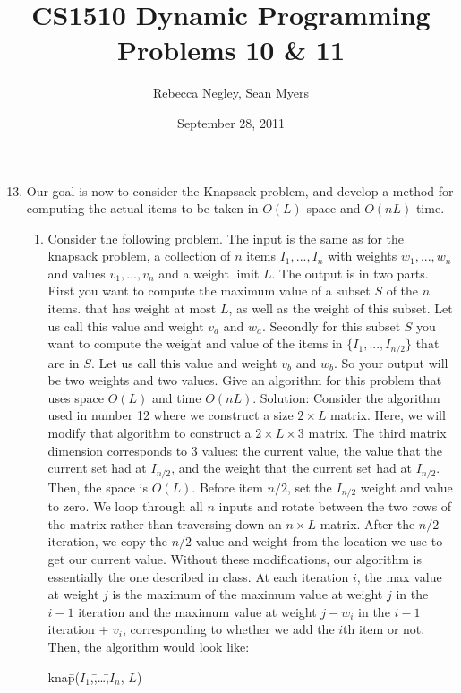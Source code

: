 \documentclass{article}
\title{CS1510  Dynamic Programming Problems 10 \& 11}
\author{Rebecca Negley, Sean Myers}
\date{September 28, 2011}
\begin{document}
\maketitle

\begin{enumerate}
\setcounter{enumi}{12}
\item Our goal is now to consider the Knapsack problem, and develop a method for computing the actual items to be taken in $O(L)$ space and $O(nL)$ time.
\begin{enumerate}
\item Consider the following problem. The input is the same as for the knapsack problem, a collection of $n$ items $I_{1}, ..., I_{n}$ with weights $w_{1}, ..., w_{n}$ and values $v_{1}, ..., v_{n}$ and a weight limit $L$. The output is in two parts. First you want to compute the maximum value of a subset $S$ of the $n$ items. that has weight at most $L$, as well as the weight of this subset. Let us call this value and weight $v_{a}$ and $w_{a}$. Secondly for this subset $S$ you want to compute the weight and value of the  items in $\{I_{1}, ..., I_{n/2}\}$ that are in $S$. Let us call this value and weight $v_{b}$ and $w_{b}$. So your output  will be two weights and two values. Give an algorithm for this problem that uses space $O(L)$ and time $O(nL)$.
\newline
\newline Solution: Consider the algorithm used in number 12 where we construct a size $2\times L$ matrix. Here, we will modify that algorithm to construct a $2\times L\times 3$ matrix. The third matrix dimension corresponds to 3 values: the current value, the value that the current set had at $I_{n/2}$, and the weight that the current set had at $I_{n/2}$. Then, the space is $O(L)$. Before item $n/2$, set the $I_{n/2}$ weight and value to zero. We loop through all $n$ inputs and rotate between the two rows of the matrix rather than traversing down an $n\times L$ matrix. After the $n/2$ iteration, we copy the $n/2$ value and weight from the location we use to get our current value. Without these modifications, our algorithm is essentially the one described in class. At each iteration $i$, the max value at weight $j$ is the maximum of the maximum value at weight $j$ in the $i-1$ iteration and the maximum value at weight $j-w_i$ in the $i-1$ iteration + $v_i$, corresponding to whether we add the $i$th item or not. Then, the algorithm would look like:
\begin{tabbing}
kna\= p($I_1$,\= ,\ldots \= ,$I_n$, $L$)\\

\end{tabbing}
\end{enumerate}
\end{enumerate}
\end{document}
